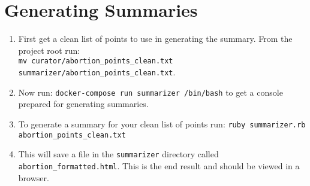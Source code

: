 \section{Generating Summaries}
\begin{enumerate}
	\item{First get a clean list of points to use in generating the summary. From the project root run: \\ \texttt{mv curator/abortion\_points\_clean.txt summarizer/abortion\_points\_clean.txt}.}
	\item{Now run: \texttt{docker-compose run summarizer /bin/bash} to get a console prepared for generating summaries.}
	\item{To generate a summary for your clean list of points run: \texttt{ruby summarizer.rb abortion\_points\_clean.txt}}
	\item{This will save a file in the \texttt{summarizer} directory called \texttt{abortion\_formatted.html}. This is the end result and should be viewed in a browser.}
\end{enumerate}

